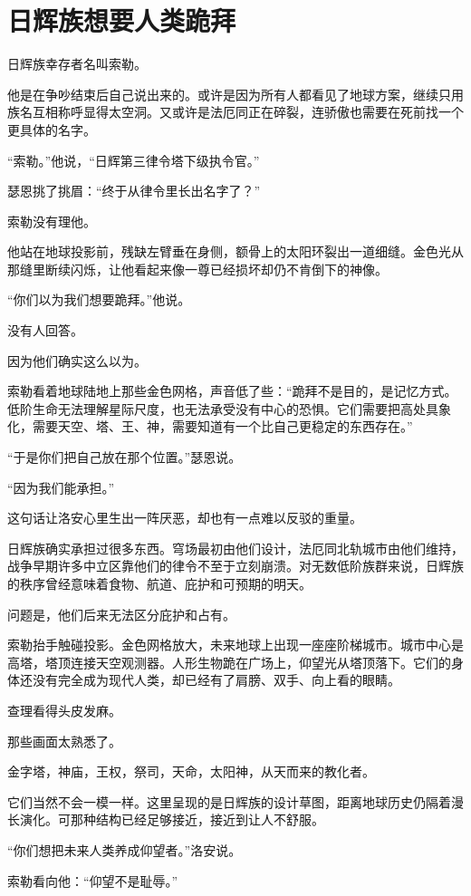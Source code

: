 \chapter{日辉族想要人类跪拜}

日辉族幸存者名叫索勒。

他是在争吵结束后自己说出来的。或许是因为所有人都看见了地球方案，继续只用族名互相称呼显得太空洞。又或许是法厄同正在碎裂，连骄傲也需要在死前找一个更具体的名字。

“索勒。”他说，“日辉第三律令塔下级执令官。”

瑟恩挑了挑眉：“终于从律令里长出名字了？”

索勒没有理他。

他站在地球投影前，残缺左臂垂在身侧，额骨上的太阳环裂出一道细缝。金色光从那缝里断续闪烁，让他看起来像一尊已经损坏却仍不肯倒下的神像。

“你们以为我们想要跪拜。”他说。

没有人回答。

因为他们确实这么以为。

索勒看着地球陆地上那些金色网格，声音低了些：“跪拜不是目的，是记忆方式。低阶生命无法理解星际尺度，也无法承受没有中心的恐惧。它们需要把高处具象化，需要天空、塔、王、神，需要知道有一个比自己更稳定的东西存在。”

“于是你们把自己放在那个位置。”瑟恩说。

“因为我们能承担。”

这句话让洛安心里生出一阵厌恶，却也有一点难以反驳的重量。

日辉族确实承担过很多东西。穹场最初由他们设计，法厄同北轨城市由他们维持，战争早期许多中立区靠他们的律令不至于立刻崩溃。对无数低阶族群来说，日辉族的秩序曾经意味着食物、航道、庇护和可预期的明天。

问题是，他们后来无法区分庇护和占有。

索勒抬手触碰投影。金色网格放大，未来地球上出现一座座阶梯城市。城市中心是高塔，塔顶连接天空观测器。人形生物跪在广场上，仰望光从塔顶落下。它们的身体还没有完全成为现代人类，却已经有了肩膀、双手、向上看的眼睛。

查理看得头皮发麻。

那些画面太熟悉了。

金字塔，神庙，王权，祭司，天命，太阳神，从天而来的教化者。

它们当然不会一模一样。这里呈现的是日辉族的设计草图，距离地球历史仍隔着漫长演化。可那种结构已经足够接近，接近到让人不舒服。

“你们想把未来人类养成仰望者。”洛安说。

索勒看向他：“仰望不是耻辱。”

